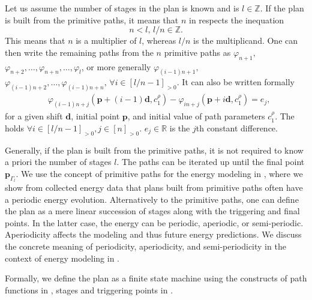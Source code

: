 Let us assume the number of stages in the plan is known and is $l\in\mathbb{Z}$. If the plan is built from the primitive paths, it means that $n$ in  respects the inequation
\begin{equation}
  n<l,\,l/n\in\mathbb{Z}.
\end{equation}
This means that $n$ is a multiplier of $l$, whereas $l/n$ is the multiplicand. One can then write the remaining paths from the $n$ primitive paths as $\varphi_{n+1},$ $\varphi_{n+2},\dots,\varphi_{n+n},\dots,\varphi_l$, or more generally $\varphi_{(i-1)n+1},$ $\varphi_{(i-1)n+2},\dots,\varphi_{(i-1)n+n},\,\forall i\in[l/n-1]_{>0}$. It can also be written formally
\begin{equation}\label{eq:primitive}\begin{split}
  &\varphi_{(i-1)n+j}(\mathbf{p}+(i-1)\mathbf{d},c_1^\rho)-\varphi_{in+j}(\mathbf{p}+i\mathbf{d},c_1^\rho)=e_j,
\end{split}\end{equation}
for a given shift $\mathbf{d}$, initial point $\mathbf{p}$, and initial value of path parameters $c_1^\rho$. The  holds $\forall i\in[l/n-1]_{>0},j\in[n]_{>0}$. $e_j\in\mathbb{R}$ is the $j$th constant difference.

Generally, if the plan is built from the primitive paths, it is not required to know a priori the number of stages $l$. The paths can be iterated up until the final point $\mathbf{p}_{\Gamma_l}$. We use the concept of primitive paths for the energy modeling in , where we show from collected energy data that plans built from primitive paths often have a periodic energy evolution. Alternatively to the primitive paths, one can define the plan as a mere linear succession of stages along with the triggering and final points. In the latter case, the energy can be periodic, aperiodic, or semi-periodic. Aperiodicity affects the modeling and thus future energy predictions. We discuss the concrete meaning of periodicity, aperiodicity, and semi-periodicity in the context of energy modeling in .

Formally, we define the plan as a finite state machine using the constructs of path functions in , stages and triggering points in .

